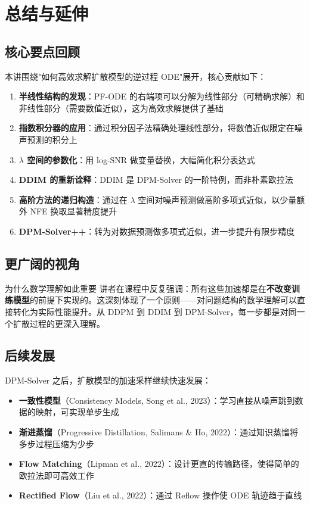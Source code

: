 \section{总结与延伸}

\subsection{核心要点回顾}

本讲围绕"如何高效求解扩散模型的逆过程 ODE"展开，核心贡献如下：

\begin{enumerate}
    \item \textbf{半线性结构的发现}：PF-ODE 的右端项可以分解为线性部分（可精确求解）和非线性部分（需要数值近似），这为高效求解提供了基础
    \item \textbf{指数积分器的应用}：通过积分因子法精确处理线性部分，将数值近似限定在噪声预测的积分上
    \item \textbf{$\lambda$ 空间的参数化}：用 log-SNR 做变量替换，大幅简化积分表达式
    \item \textbf{DDIM 的重新诠释}：DDIM 是 DPM-Solver 的一阶特例，而非朴素欧拉法
    \item \textbf{高阶方法的递归构造}：通过在 $\lambda$ 空间对噪声预测做高阶多项式近似，以少量额外 NFE 换取显著精度提升
    \item \textbf{DPM-Solver++}：转为对数据预测做多项式近似，进一步提升有限步精度
\end{enumerate}

\subsection{更广阔的视角}

\begin{knowledgebox}{为什么数学理解如此重要}
讲者在课程中反复强调：所有这些加速都是在\textbf{不改变训练模型}的前提下实现的。这深刻体现了一个原则——对问题结构的数学理解可以直接转化为实际性能提升。从 DDPM 到 DDIM 到 DPM-Solver，每一步都是对同一个扩散过程的更深入理解。
\end{knowledgebox}

\subsection{后续发展}

DPM-Solver 之后，扩散模型的加速采样继续快速发展：

\begin{itemize}
    \item \textbf{一致性模型}（Consistency Models, Song et al., 2023）：学习直接从噪声跳到数据的映射，可实现单步生成
    \item \textbf{渐进蒸馏}（Progressive Distillation, Salimans \& Ho, 2022）：通过知识蒸馏将多步过程压缩为少步
    \item \textbf{Flow Matching}（Lipman et al., 2022）：设计更直的传输路径，使得简单的欧拉法即可高效工作
    \item \textbf{Rectified Flow}（Liu et al., 2022）：通过 Reflow 操作使 ODE 轨迹趋于直线
\end{itemize}

